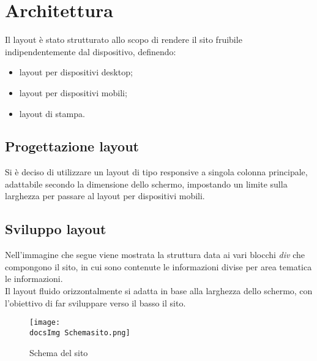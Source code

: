 \section{Architettura}{
	Il layout è stato strutturato allo scopo di rendere il sito fruibile indipendentemente dal dispositivo, definendo:
	\begin{itemize}\itemsep1pt
		\item layout per dispositivi desktop;
		\item layout per dispositivi mobili;
		\item layout di stampa.
	\end{itemize} 
	
	\subsection{Progettazione layout}{
		Si è deciso di utilizzare un layout di tipo responsive a singola colonna principale, adattabile secondo la dimensione dello schermo, impostando un limite sulla larghezza per passare al layout per dispositivi mobili.
	}
	\subsection{Sviluppo layout}{
		Nell'immagine che segue viene mostrata la struttura data ai vari blocchi \textit{div} che compongono il sito, in cui sono contenute le informazioni divise per area tematica le informazioni.
	\\
	Il layout fluido orizzontalmente si adatta in base alla larghezza dello schermo, con l'obiettivo di far sviluppare verso il basso il sito.
		\begin{figure}[ht]
			\texttt{[image: \\docsImg Schemasito.png]}
			\caption{Schema del sito}
			\label{Schema del sito}
		\end{figure}
		
}}
